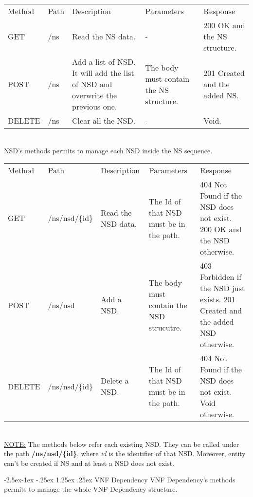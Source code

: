 \documentclass[11pt, english]{article}
\makeatletter
\renewcommand\paragraph{\@startsection{paragraph}{4}{\z@}%
            {-2.5ex\@plus -1ex \@minus -.25ex}%
            {1.25ex \@plus .25ex}%
            {\normalfont\normalsize\bfseries}}
\makeatother
\begin{document}
\begin{tabular}{ |p{2cm}|m{3cm}|p{3cm}|p{3cm}|p{4cm}| }
    \hline
    \rowcolor{black} \multicolumn{5}{|c|}{\textcolor{white}{NS}} \\
    \hline
    \rowcolor{Gray}
    Method & Path & Description & Parameters & Response \\
    \hline
    GET   & /ns & Read the NS data. & - & 200 OK and the NS structure. \\
    \hline
    POST & /ns & Add a list of NSD. It will add the list of NSD and overwrite the previous one. & The body must contain the NS structure. & 201 Created and the added NS. \\
    \hline
    DELETE & /ns & Clear all the NSD.  & - & Void. \\
    \hline
\end{tabular} \\

NSD's methods permits to manage each NSD inside the NS sequence. \\

\begin{tabular}{ |p{2cm}|m{3cm}|p{3cm}|p{3cm}|p{4cm}| }
    \hline
    \rowcolor{black} \multicolumn{5}{|c|}{\textcolor{white}{NSD}} \\
    \hline
    \rowcolor{Gray}
    Method & Path & Description & Parameters & Response \\
    \hline
    GET   & /ns/nsd/\{id\} & Read the NSD data. & The Id of that NSD must be in the path. & 404 Not Found  if the NSD does not exist. 200 OK and the NSD otherwise. \\
    \hline
    POST & /ns/nsd & Add a NSD. & The body must contain the NSD strucutre. & 403 Forbidden if the NSD just exists. 201 Created and the added NSD otherwise. \\
    \hline
    DELETE & /ns/nsd/\{id\} & Delete a NSD. & The Id of that NSD must be in the path. & 404 Not Found  if the NSD does not exist. Void otherwise. \\
    \hline
\end{tabular} \\

\underline{NOTE:} The methods below refer each existing NSD. They can be called under the path \textbf{/ns/nsd/\{id\}}, where \textit{id} is the identifier of that NSD. Moreover, entity can't be created if NS and at least a NSD does not exist. 

\newpage
\paragraph{VNF Dependency}
VNF Dependency's methods permits to manage the whole VNF Dependency structure. \\
\end{document}
